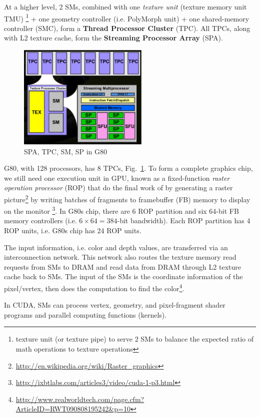 At a higher level, 2 SMs, combined with one {\it texture unit} (texture memory
unit TMU) \footnote{texture unit (or texture pipe) to serve 2 SMs to
  balance the expected ratio of math operations to texture operations}
+ one geometry controller (i.e. PolyMorph unit) + one shared-memory
controller (SMC), form a {\bf Thread Processor Cluster} (TPC). All
TPCs, along with L2 texture cache, form the
{\bf Streaming Processor Array} (SPA).

\begin{figure}[hbt]
  \centerline{\includegraphics[height=5cm,
    angle=0]{./images/G80_chip.eps}}
  \caption{SPA, TPC, SM, SP in G80}
  \label{fig:G80_chip}
\end{figure}

G80, with 128 processors, has 8 TPCs, Fig.~\ref{fig:G80_chip}.  To
form a complete graphics chip, we still need one execution unit in
GPU, known as a fixed-function {\it raster operation processor} (ROP)
that do the final work of by generating a raster
picture\footnote{\url{http://en.wikipedia.org/wiki/Raster_graphics}}
by writing batches of fragments to framebuffer (FB) memory to display
on the monitor
\footnote{\url{http://ixbtlabs.com/articles3/video/cuda-1-p3.html}}.
In G80s chip, there are 6 ROP partition and six 64-bit FB memory
controllers (i.e. $6\times 64=384$-bit bandwidth). Each ROP partition
has 4 ROP units, i.e. G80s chip has 24 ROP units.


The input information, i.e. color and depth values, are transferred
via an interconnection network. This network also routes the texture
memory read requests from SMs to DRAM and read data from DRAM through
L2 texture cache back to SMs.  The input of the SMs is the coordinate
information of the pixel/vertex, then does the computation to find the
color\footnote{\url{http://www.realworldtech.com/page.cfm?ArticleID=RWT090808195242&p=10}}.

\begin{framed}
  In CUDA, SMs can process vertex, geometry, and pixel-fragment shader
  programs and parallel computing functions (kernels).
\end{framed}

